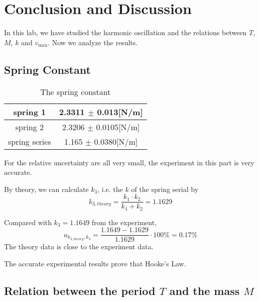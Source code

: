 \section{Conclusion and Discussion}


In this lab, we have studied the harmonic oscillation 
and the relations between $T$, $M$, $k$ and $v_{\max}$. 
Now we analyze the results.


\subsection{Spring Constant}


\begin{table}[H]
\centering
\begin{tabular}{|c|c|}
spring 1 & 2.3311 $\pm$ 0.013[N/m] \\ \hline
spring 2 & 2.3206 $\pm$ 0.0105[N/m] \\ \hline
spring series & 1.165 $\pm$ 0.0380[N/m]  \\ \hline
\end{tabular}
\caption{The spring constant}
\end{table}


For the relative uncertainty are all very small,
the experiment in this part is very accurate.

By theory, we can calculate $k_3$, i.e. the $k$ of the spring serial by 
$$ k_{3,theory} = \frac{k_1 \cdot k_2 }{k_1 + k_2} =  1.1629 $$ 

Compared with $k_3 = 1.1649$  from the experiment,
$$ u_{k_{3,theory},k_3} = \frac{1.1649 - 1.1629}{1.1629} \cdot 100 \%  = 0.17 \% $$ 
The theory data is close to the experiment data.

The accurate experimental results prove that Hooke’s Law.



\subsection{Relation between the period $T$ and the mass $M$}

